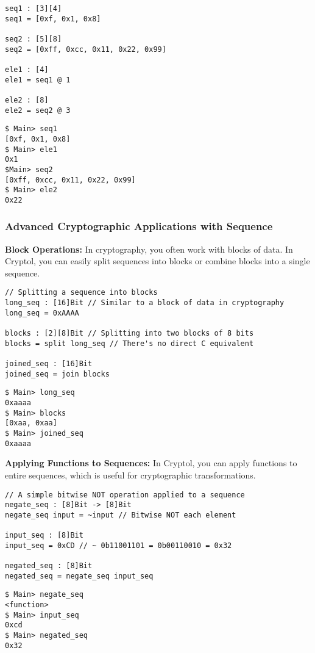 \begin{lstlisting}[style=cryptol]
seq1 : [3][4]
seq1 = [0xf, 0x1, 0x8]

seq2 : [5][8]
seq2 = [0xff, 0xcc, 0x11, 0x22, 0x99]

ele1 : [4]
ele1 = seq1 @ 1

ele2 : [8]
ele2 = seq2 @ 3
\end{lstlisting}
\begin{lstlisting}[style=zsh]
$ Main> seq1
[0xf, 0x1, 0x8]
$ Main> ele1
0x1
$Main> seq2
[0xff, 0xcc, 0x11, 0x22, 0x99]
$ Main> ele2
0x22
\end{lstlisting}

\subsubsection{Advanced Cryptographic Applications with Sequence}
\textbf{Block Operations:} In cryptography, you often work with blocks of data. In Cryptol, you can easily split sequences into blocks or combine blocks into a single sequence.
\begin{lstlisting}[style=cryptol]
// Splitting a sequence into blocks
long_seq : [16]Bit // Similar to a block of data in cryptography
long_seq = 0xAAAA

blocks : [2][8]Bit // Splitting into two blocks of 8 bits
blocks = split long_seq // There's no direct C equivalent

joined_seq : [16]Bit
joined_seq = join blocks
\end{lstlisting}
\begin{lstlisting}[style=zsh]
$ Main> long_seq
0xaaaa
$ Main> blocks
[0xaa, 0xaa]
$ Main> joined_seq
0xaaaa
\end{lstlisting}
\vspace{16pt}
\textbf{Applying Functions to Sequences:} In Cryptol, you can apply functions to entire sequences, which is useful for cryptographic transformations.
\begin{lstlisting}[style=cryptol]
// A simple bitwise NOT operation applied to a sequence
negate_seq : [8]Bit -> [8]Bit
negate_seq input = ~input // Bitwise NOT each element

input_seq : [8]Bit
input_seq = 0xCD // ~ 0b11001101 = 0b00110010 = 0x32

negated_seq : [8]Bit
negated_seq = negate_seq input_seq
\end{lstlisting}
\begin{lstlisting}[style=zsh]
$ Main> negate_seq
<function>
$ Main> input_seq
0xcd
$ Main> negated_seq
0x32
\end{lstlisting}

